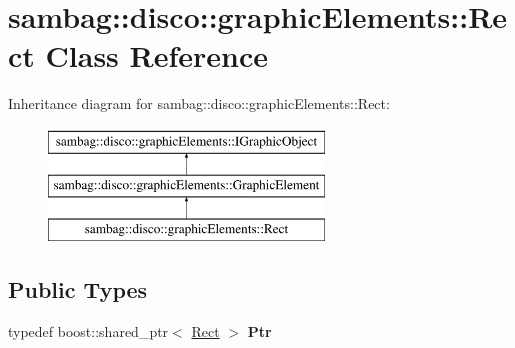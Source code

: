 \hypertarget{classsambag_1_1disco_1_1graphic_elements_1_1_rect}{
\section{sambag::disco::graphicElements::Rect Class Reference}
\label{classsambag_1_1disco_1_1graphic_elements_1_1_rect}
}
Inheritance diagram for sambag::disco::graphicElements::Rect:\begin{figure}[H]
\begin{center}
\leavevmode
\includegraphics[height=3.000000cm]{classsambag_1_1disco_1_1graphic_elements_1_1_rect}
\end{center}
\end{figure}
\subsection*{Public Types}
\begin{DoxyCompactItemize}
\item 
\hypertarget{classsambag_1_1disco_1_1graphic_elements_1_1_rect_a33ffac9e2de5f297240c82c85a317c6b}{
typedef boost::shared\_\-ptr$<$ \hyperlink{classsambag_1_1disco_1_1graphic_elements_1_1_rect}{Rect} $>$ {\bfseries Ptr}}
\label{classsambag_1_1disco_1_1graphic_elements_1_1_rect_a33ffac9e2de5f297240c82c85a317c6b}

\end{DoxyCompactItemize}
